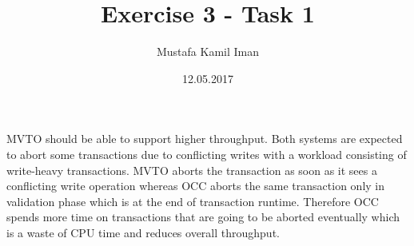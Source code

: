 \documentclass{article}
\title{Exercise 3 - Task 1}
\author{Mustafa Kamil Iman}
\begin{document}
\date{12.05.2017}
\maketitle

MVTO should be able to support higher throughput. Both systems are expected to abort some transactions due to conflicting writes with a workload consisting of write-heavy transactions. MVTO aborts the transaction as soon as it sees a conflicting write operation whereas OCC aborts the same transaction only in validation phase which is at the end of transaction runtime. Therefore OCC spends more time on transactions that are going to be aborted eventually which is a waste of CPU time and reduces overall throughput. 
\end{document}
